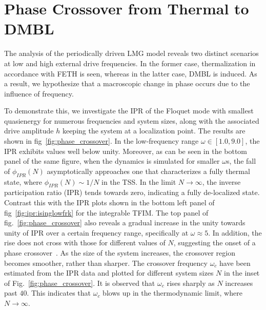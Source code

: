 \documentclass[%
reprint,
superscriptaddress,
amsmath,amssymb,
aps,
prb,
showkeys,
]{revtex4-2}
\begin{document}
\section{\label{sec:level5}Phase Crossover from Thermal to DMBL}
The analysis of the periodically driven LMG model reveals two distinct scenarios at low and high external drive frequencies. In the former case, thermalization in accordance with FETH is seen, whereas in the latter case, DMBL is induced. As a result, we hypothesize that a macroscopic change in phase occurs due to the influence of frequency. 

To demonstrate this, we investigate the IPR of the  Floquet mode with smallest quasienergy
for numerous frequencies and system sizes, along with the associated drive amplitude $h$ keeping the system at a localization point. The results are shown in fig~\ref{fig:phase_crossover}. In the low-frequency range $\omega \in \left[1.0, 9.0\right]$, the IPR exhibits values well below unity.   {Moreover, as can be seen in the bottom panel of the same figure, when the dynamics is simulated for smaller} $\omega$s, {the fall of} $\phi_{IPR}(N)$ {asymptotically approaches one that characterizes a fully thermal state, where} $\phi_{IPR}(N)\sim 1/N$ {in the TSS. } In the limit  $N\rightarrow\infty$, the inverse participation ratio (IPR) tends towards zero, indicating a fully de-localized state.  {Contrast this with the IPR plots shown in the bottom left panel of fig}~\ref{fig:ipr:isinglowfrk} {for the integrable TFIM}.  {The top panel of fig.}~\ref{fig:phase_crossover} {also reveals} a gradual increase {in the unity} {towards unity} of IPR over a certain frequency range, specifically at $\omega \approx 5$. In addition, the rise does not cross with those for different values of $N$, suggesting the onset of a phase crossover~\cite{sierant_2023, sachdev_quantum_2011}. As the size of the system increases, the crossover region becomes smoother, rather than sharper.  The crossover frequency $\omega_c$ have been estimated from the IPR data and plotted for different system sizes $N$ in the inset of Fig.~\ref{fig:phase_crossover}. It is observed that $\omega_c$ rises sharply as $N$ increases past $40$. This indicates that $\omega_c$ blows up in the thermodynamic limit, where $N \to \infty$.
\end{document}
